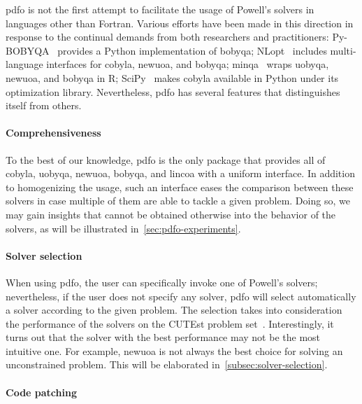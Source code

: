 \Gls{pdfo} is not the first attempt to facilitate the usage of Powell's solvers in languages other than Fortran.
Various efforts have been made in this direction in response to the continual demands from both researchers and practitioners: Py-BOBYQA~\cite{Cartis_Etal_2019} provides a Python implementation of \gls{bobyqa}; NLopt~\cite{Johnson_2019} includes multi-language interfaces for \gls{cobyla}, \gls{newuoa}, and \gls{bobyqa}; minqa~\cite{Bates_Etal_2014} wraps \gls{uobyqa}, \gls{newuoa}, and \gls{bobyqa} in R; SciPy~\cite{Virtanen_Etal_2020} makes \gls{cobyla} available in Python under its optimization library.
Nevertheless, \gls{pdfo} has several features that distinguishes itself from others.

\paragraph{Comprehensiveness}

To the best of our knowledge, \gls{pdfo} is the only package that provides all of \gls{cobyla}, \gls{uobyqa}, \gls{newuoa}, \gls{bobyqa}, and \gls{lincoa} with a uniform interface.
In addition to homogenizing the usage, such an interface eases the comparison between these solvers in case multiple of them are able to tackle a given problem.
Doing so, we may gain insights that cannot be obtained otherwise into the behavior of the solvers, as will be illustrated in~\cref{sec:pdfo-experiments}.

\paragraph{Solver selection}

When using \gls{pdfo}, the user can specifically invoke one of Powell's solvers; nevertheless, if the user does not specify any solver, \gls{pdfo} will select automatically a solver according to the given problem.
The selection takes into consideration the performance of the solvers on the CUTEst problem set~\cite{Gould_Orban_Toint_2015}.
Interestingly, it turns out that the solver with the best performance may not be the most intuitive one.
For example, \gls{newuoa} is not always the best choice for solving an unconstrained problem.
This will be elaborated in~\cref{subsec:solver-selection}.

\paragraph{Code patching}

